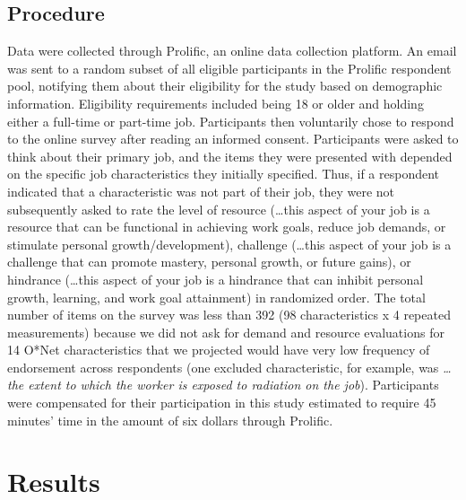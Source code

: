 \documentclass[
  man,mask]{apa6}
\begin{document}
\hypertarget{procedure}{%
\subsection{Procedure}\label{procedure}}

Data were collected through Prolific, an online data collection platform. An email was sent to a random subset of all eligible participants in the Prolific respondent pool, notifying them about their eligibility for the study based on demographic information. Eligibility requirements included being 18 or older and holding either a full-time or part-time job. Participants then voluntarily chose to respond to the online survey after reading an informed consent. Participants were asked to think about their primary job, and the items they were presented with depended on the specific job characteristics they initially specified. Thus, if a respondent indicated that a characteristic was not part of their job, they were not subsequently asked to rate the level of resource (\ldots this aspect of your job is a resource that can be functional in achieving work goals, reduce job demands, or stimulate personal growth/development), challenge (\ldots this aspect of your job is a challenge that can promote mastery, personal growth, or future gains), or hindrance (\ldots this aspect of your job is a hindrance that can inhibit personal growth, learning, and work goal attainment) in randomized order. The total number of items on the survey was less than 392 (98 characteristics x 4 repeated measurements) because we did not ask for demand and resource evaluations for 14 O*Net characteristics that we projected would have very low frequency of endorsement across respondents (one excluded characteristic, for example, was \emph{\ldots the extent to which the worker is exposed to radiation on the job}). Participants were compensated for their participation in this study estimated to require 45 minutes' time in the amount of six dollars through Prolific.

\hypertarget{results}{%
\section{Results}\label{results}}
\end{document}
